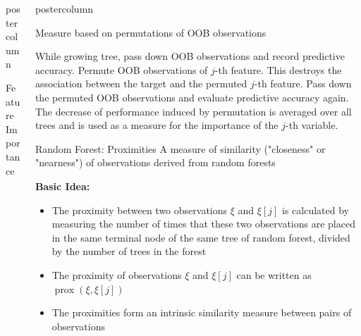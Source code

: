 \documentclass{beamer}
\newlength{\columnheight} %
\begin{document}
\begin{frame}[fragile]{}
\begin{columns}
\begin{column}{.31\textwidth}
\begin{beamercolorbox}[center]{postercolumn}
\begin{minipage}{.98\textwidth}
{\begin{myblock}{Feature Importance}
  
  \end{myblock}
}
\end{minipage}
\end{beamercolorbox}
\end{column}


\begin{column}{.31\textwidth}
\begin{beamercolorbox}[center]{postercolumn}
\begin{minipage}{.98\textwidth}
\parbox[t][\columnheight]{\textwidth}{
  \begin{myblock}{ }
  \begin{algorithm}[H]
  \small
  \caption{Measure based on permutations of OOB observations}
  \begin{algorithmic}[0]
  \State While growing tree, pass down OOB observations and record predictive accuracy.
  \State Permute OOB observations of $j$-th feature. This destroys the association between the target and the permuted $j$-th feature.
  \State Pass down the permuted OOB observations and evaluate predictive accuracy again.
  \State The decrease of performance induced by permutation is averaged over all trees and is used as a measure for the importance of the $j$-th variable.
  \end{algorithmic}
  \end{algorithm}
  
  \end{myblock}
  \begin{myblock}{Random Forest: Proximities}
  A measure of similarity ("closeness" or "nearness") of observations derived from random forests
  
  \begin{codebox} 
  \textbf{Basic Idea: }	
  \end{codebox}
  
  
  \begin{itemize}[$\bullet$]     
  \setlength{\itemindent}{+.3in}
  \item The proximity between two observations $\xi$ and $\xi[j]$ is calculated by measuring the number of times that these two observations are placed in the same terminal node of the same tree of random forest, divided by the number of trees in the forest
  \item The proximity of observations $\xi$ and $\xi[j]$ can be written as $\operatorname{prox}\left(\xi, \xi[j]\right)$
    \item The proximities form an intrinsic similarity measure between pairs of observations
  \end{itemize}
  

\end{myblock}}
\end{minipage}
\end{beamercolorbox}
\end{column}
\end{columns}
\end{frame}
\end{document}
